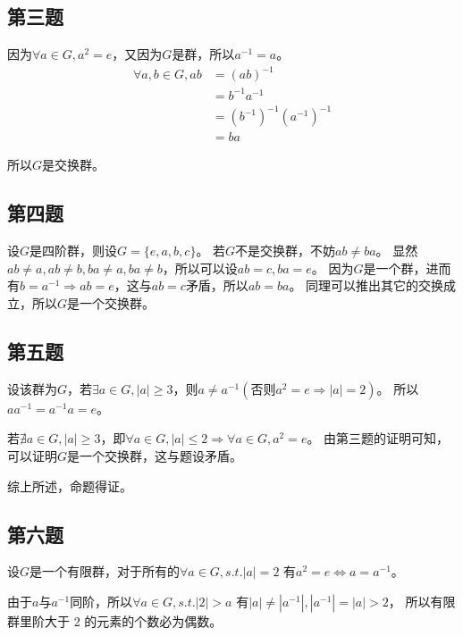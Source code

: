 \documentclass[12pt,onecolumn]{article}
\theoremstyle{plain}
\begin{document}
\subsection{第三题}
\begin{proof*}
  因为$\forall a \in G, a^2 = e$，又因为$G$是群，所以$a^{-1} = a$。
  \begin{align*}
    \forall a, b \in G, ab &= {(ab)}^{-1} \\
                   &= b^{-1}a^{-1} \\
                   &= {(b^{-1})}^{-1}{(a^{-1})}^{-1} \\
                   &= ba
  \end{align*}

  所以$G$是交换群。
\end{proof*}

\subsection{第四题}
\begin{proof*}
  设$G$是四阶群，则设$G = \{e, a, b, c\}$。
  若$G$不是交换群，不妨$ab \neq ba$。
  显然$ab \neq a, ab \neq b, ba \neq a, ba \neq b$，所以可以设$ab = c, ba = e$。
  因为$G$是一个群，进而有$b = a^{-1} \Rightarrow ab = e$，这与$ab = c$矛盾，所以$ab = ba$。
  同理可以推出其它的交换成立，所以$G$是一个交换群。
\end{proof*}

\subsection{第五题}
\begin{proof*}
  设该群为$G$，若$\exists a \in G,|a| \geq 3$，则$a \neq a^{-1}(\text{否则}a^2 = e \Rightarrow |a| = 2)$。
  所以$aa^{-1} = a^{-1}a = e$。

  若$\nexists a \in G, |a| \geq 3$，即$\forall a \in G, |a| \leq 2 \Rightarrow \forall a \in G, a^2 = e$。
  由第三题的证明可知，可以证明$G$是一个交换群，这与题设矛盾。

  综上所述，命题得证。
\end{proof*}

\subsection{第六题}
\begin{proof*}
  设$G$是一个有限群，对于所有的$\forall a \in G, s.t. |a| = 2$
  有$a^2 = e \iff a = a^{-1}$。

  由于$a$与$a^{-1}$同阶，所以$\forall a\in G, s.t. |2| > a$
  有$|a| \neq |a^{-1}|, |a^{-1}| = |a| > 2$，
  所以有限群里阶大于 2 的元素的个数必为偶数。
\end{proof*}
\end{document}

